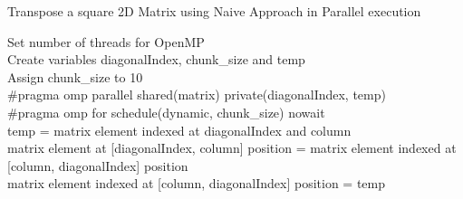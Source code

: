 \documentclass[10pt, onecolumn]{article}
\begin{document}
%
\begin{algorithm}[H]
    \label{Alg:OpenMPDiagonalAlgorithm}
    \caption{Transpose a square 2D Matrix using Naive Approach in Parallel execution}
    Set number of threads for OpenMP\\
    Create variables diagonalIndex, chunk\_size and temp\\
    Assign chunk\_size to 10 \\
    \#pragma omp parallel shared(matrix) private(diagonalIndex, temp)\\
    \#pragma omp for schedule(dynamic, chunk\_size) nowait\\
    {
        {
            temp = matrix element indexed at diagonalIndex and column \\
            matrix element at [diagonalIndex, column] position = matrix element indexed at [column,  diagonalIndex] position \\
            matrix element indexed at [column, diagonalIndex] position = temp
        }
    }
\end{algorithm}
%
\end{document}
